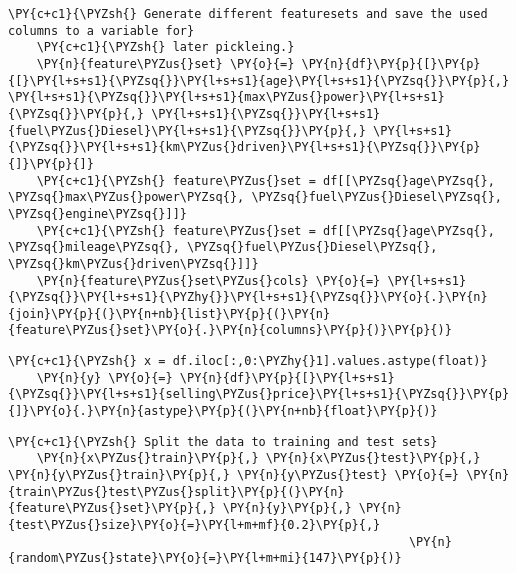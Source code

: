         \begin{tcolorbox}[breakable, size=fbox, boxrule=1pt, pad at break*=1mm,colback=cellbackground, colframe=cellborder]
    \begin{Verbatim}[commandchars=\\\{\}]
    \PY{c+c1}{\PYZsh{} Generate different featuresets and save the used columns to a variable for}
    \PY{c+c1}{\PYZsh{} later pickleing.}
    \PY{n}{feature\PYZus{}set} \PY{o}{=} \PY{n}{df}\PY{p}{[}\PY{p}{[}\PY{l+s+s1}{\PYZsq{}}\PY{l+s+s1}{age}\PY{l+s+s1}{\PYZsq{}}\PY{p}{,} \PY{l+s+s1}{\PYZsq{}}\PY{l+s+s1}{max\PYZus{}power}\PY{l+s+s1}{\PYZsq{}}\PY{p}{,} \PY{l+s+s1}{\PYZsq{}}\PY{l+s+s1}{fuel\PYZus{}Diesel}\PY{l+s+s1}{\PYZsq{}}\PY{p}{,} \PY{l+s+s1}{\PYZsq{}}\PY{l+s+s1}{km\PYZus{}driven}\PY{l+s+s1}{\PYZsq{}}\PY{p}{]}\PY{p}{]}
    \PY{c+c1}{\PYZsh{} feature\PYZus{}set = df[[\PYZsq{}age\PYZsq{}, \PYZsq{}max\PYZus{}power\PYZsq{}, \PYZsq{}fuel\PYZus{}Diesel\PYZsq{}, \PYZsq{}engine\PYZsq{}]]}
    \PY{c+c1}{\PYZsh{} feature\PYZus{}set = df[[\PYZsq{}age\PYZsq{}, \PYZsq{}mileage\PYZsq{}, \PYZsq{}fuel\PYZus{}Diesel\PYZsq{}, \PYZsq{}km\PYZus{}driven\PYZsq{}]]}
    \PY{n}{feature\PYZus{}set\PYZus{}cols} \PY{o}{=} \PY{l+s+s1}{\PYZsq{}}\PY{l+s+s1}{\PYZhy{}}\PY{l+s+s1}{\PYZsq{}}\PY{o}{.}\PY{n}{join}\PY{p}{(}\PY{n+nb}{list}\PY{p}{(}\PY{n}{feature\PYZus{}set}\PY{o}{.}\PY{n}{columns}\PY{p}{)}\PY{p}{)}
    \end{Verbatim}
    \end{tcolorbox}
    
        \begin{tcolorbox}[breakable, size=fbox, boxrule=1pt, pad at break*=1mm,colback=cellbackground, colframe=cellborder]
    \begin{Verbatim}[commandchars=\\\{\}]
    \PY{c+c1}{\PYZsh{} x = df.iloc[:,0:\PYZhy{}1].values.astype(float)}
    \PY{n}{y} \PY{o}{=} \PY{n}{df}\PY{p}{[}\PY{l+s+s1}{\PYZsq{}}\PY{l+s+s1}{selling\PYZus{}price}\PY{l+s+s1}{\PYZsq{}}\PY{p}{]}\PY{o}{.}\PY{n}{astype}\PY{p}{(}\PY{n+nb}{float}\PY{p}{)}
    \end{Verbatim}
    \end{tcolorbox}
    
        \begin{tcolorbox}[breakable, size=fbox, boxrule=1pt, pad at break*=1mm,colback=cellbackground, colframe=cellborder]
    \begin{Verbatim}[commandchars=\\\{\}]
    \PY{c+c1}{\PYZsh{} Split the data to training and test sets}
    \PY{n}{x\PYZus{}train}\PY{p}{,} \PY{n}{x\PYZus{}test}\PY{p}{,} \PY{n}{y\PYZus{}train}\PY{p}{,} \PY{n}{y\PYZus{}test} \PY{o}{=} \PY{n}{train\PYZus{}test\PYZus{}split}\PY{p}{(}\PY{n}{feature\PYZus{}set}\PY{p}{,} \PY{n}{y}\PY{p}{,} \PY{n}{test\PYZus{}size}\PY{o}{=}\PY{l+m+mf}{0.2}\PY{p}{,}
                                                        \PY{n}{random\PYZus{}state}\PY{o}{=}\PY{l+m+mi}{147}\PY{p}{)}
    \end{Verbatim}
    \end{tcolorbox}
    
